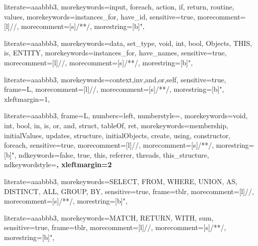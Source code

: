 
{
literate={aaa}{bbb}3,
morekeywords={input, foreach, action, if, return, routine, values},
morekeywords={instances_for, have_id},
sensitive=true,
morecomment=[l]{//},
morecomment=[s]{/*}{*/},
morestring=[b]",
}

{
literate={aaa}{bbb}3,
morekeywords={data, set_type, void, int, bool, Objects, THIS, is, ENTITY},
morekeywords={instances_for, have_names},
sensitive=true,
morecomment=[l]{//},
morecomment=[s]{/*}{*/},
morestring=[b]",
}

{
literate={aaa}{bbb}3,
morekeywords={context,inv,and,or,self},
sensitive=true,
frame=L,
morecomment=[l]{//},
morecomment=[s]{/*}{*/},
morestring=[b]",
xleftmargin=1\parindent,
}

{
literate={aaa}{bbb}3,
frame=L, %
numbers=left,
numberstyle=\color{black}\scriptsize,
morekeywords={void, int, bool, in, is, or, and, struct, tableOf, ret},
morekeywords={membership, initialValues, updates, structure, initialObjects, create, using, constructor, foreach},
sensitive=true,
morecomment=[l]{//},
morecomment=[s]{/*}{*/},
morestring=[b]",
ndkeywords={false, true, this, referrer, threads, this_structure},
ndkeywordstyle=\color{blue}\bfseries,
xleftmargin=2\parindent
}

{
literate={aaa}{bbb}3,
morekeywords={SELECT, FROM, WHERE, UNION, AS, DISTINCT, ALL, GROUP, BY},
sensitive=true,
frame=tblr,
morecomment=[l]{//},
morecomment=[s]{/*}{*/},
morestring=[b]",
}

{
literate={aaa}{bbb}3,
morekeywords={MATCH, RETURN, WITH, sum},
sensitive=true,
frame=tblr,
morecomment=[l]{//},
morecomment=[s]{/*}{*/},
morestring=[b]",
}
